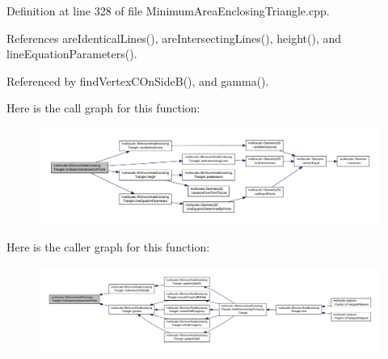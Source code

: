 Definition at line 328 of file Minimum\-Area\-Enclosing\-Triangle.\-cpp.



References are\-Identical\-Lines(), are\-Intersecting\-Lines(), height(), and line\-Equation\-Parameters().



Referenced by find\-Vertex\-C\-On\-Side\-B(), and gamma().



Here is the call graph for this function\-:\nopagebreak
\begin{figure}[H]
\begin{center}
\leavevmode
\includegraphics[width=350pt]{classmultiscale_1_1MinimumAreaEnclosingTriangle_aa26b3ef84bd96935afa8efab5dfef882_cgraph}
\end{center}
\end{figure}




Here is the caller graph for this function\-:\nopagebreak
\begin{figure}[H]
\begin{center}
\leavevmode
\includegraphics[width=350pt]{classmultiscale_1_1MinimumAreaEnclosingTriangle_aa26b3ef84bd96935afa8efab5dfef882_icgraph}
\end{center}
\end{figure}


